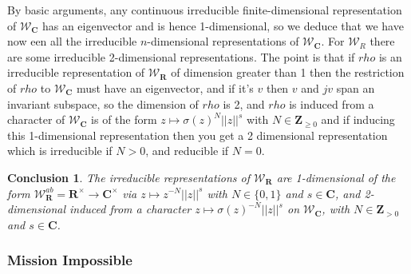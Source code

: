 \documentclass{article}
\theoremstyle{theorem}
\newtheorem{conc}{Conclusion}
\begin{document}
By basic arguments, any continuous irreducible finite-dimensional representation of $\mathcal{W}_{\mathbf{C}}$ has an eigenvector and is hence 1-dimensional, so we deduce that we have now een all the irreducible $n$-dimensional representations of $\mathcal{W}_{\mathbf{C}}$. For $\mathcal{W}_{R}$ there are some irreducible 2-dimensional representations. The point is that if $rho $ is an irreducible representation of $\mathcal{W}_{\mathbf{R}}$ of dimension greater than 1 then the restriction of $rho$ to $\mathcal{W}_{\mathbf{C}}$ must have an eigenvector, and if it's $v$ then $v$ and $jv$ span an invariant subspace, so the dimension of $rho$ is 2, and $rho$ is induced from a character of $\mathcal{W}_{\mathbf{C}}$ is of the form $z\mapsto\sigma(z)^{N}||z||^{s}$ with $N\in\mathbf{Z}_{\geq0}$ and if inducing this 1-dimensional representation then you get a 2 dimensional representation which is irreducible if $N>0$, and reducible if $N=0$.
\begin{conc}
The irreducible representations of $\mathcal{W}_{\mathbf{R}}$ are 1-dimensional of the form $\mathcal{W}^{ab}_{\mathbf{R}}=\mathbf{R}^{\times}\rightarrow\mathbf{C}^{\times}$ via $z\mapsto z^{-N}||z||^{s}$ with $N\in\{0,1\}$ and $s\in\mathbf{C}$, and 2-dimensional induced from a character $z\mapsto\sigma(z)^{-N}||z||^{s}$ on $\mathcal{W}_{\mathbf{C}}$, with $N\in \mathbf{Z}_{>0}$ and $s\in\mathbf{C}$.
\end{conc}
\subsubsection{Mission Impossible}
\end{document}
